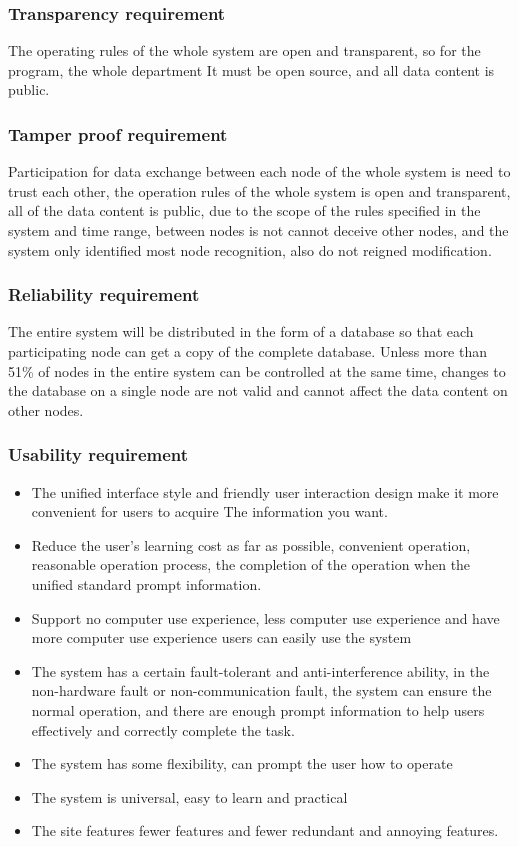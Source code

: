 \documentclass[16pt]{scrreprt}
\begin{document}
\subsubsection{Transparency requirement}
The operating rules of the whole system are open and transparent, so for the program, the whole department
It must be open source, and all data content is public.

\subsubsection{Tamper proof requirement}
Participation for data exchange between each node of the whole system is need to trust each other, the operation rules of the whole system is open and transparent, all of the data content is public, due to the scope of the rules specified in the system and time range, between nodes is not cannot deceive other nodes, and the system only identified most node recognition, also do not reigned modification.

\subsubsection{Reliability requirement}
The entire system will be distributed in the form of a database so that each participating node can get a copy of the complete database.
Unless more than 51\% of nodes in the entire system can be controlled at the same time, changes to the database on a single node are not valid and cannot affect the data content on other nodes.

\subsubsection{Usability requirement}
\begin{itemize}
    \item The unified interface style and friendly user interaction design make it more convenient for users to acquire
The information you want.
    \item Reduce the user's learning cost as far as possible, convenient operation, reasonable operation process, the completion of the operation when the unified standard prompt information.
    \item Support no computer use experience, less computer use experience and have more computer use experience users can easily use the system
    \item The system has a certain fault-tolerant and anti-interference ability, in the non-hardware fault or non-communication fault, the system can ensure the normal operation, and there are enough prompt information to help users effectively and correctly complete the task.
    \item The system has some flexibility, can prompt the user how to operate
    \item The system is universal, easy to learn and practical
    \item The site features fewer features and fewer redundant and annoying features.
\end{itemize}
\end{document}
